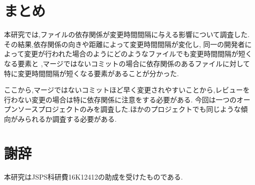 \documentclass{fose2016}           %
\begin{document}
\section{まとめ} \label{まとめ}
本研究では,ファイルの依存関係が変更時間間隔に与える影響について調査した.
その結果,依存関係の向きや距離によって変更時間間隔が変化し,
同一の開発者によって変更が行われた場合のようにどのようなファイルでも変更時間間隔が短くなる要素と
,マージではないコミットの場合に依存関係のあるファイルに対して特に変更時間間隔が短くなる要素があることが分かった.

ここから,マージではないコミットほど早く変更されやすいことから,レビューを行わない変更の場合は特に依存関係に注意をする必要がある.
今回は一つのオープンソースプロジェクトのみを調査した.ほかのプロジェクトでも同じような傾向がみられるか調査する必要がある.

\section*{謝辞}
本研究はJSPS科研費16K12412の助成を受けたものである.
\end{document}
